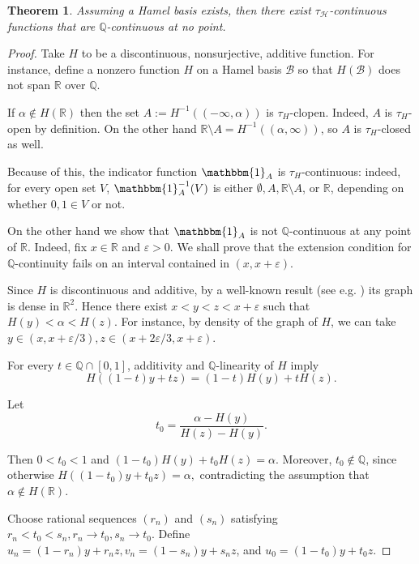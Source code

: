 \documentclass[11pt]{amsart} %
\newtheorem{theorem}{Theorem}[section]
\theoremstyle{definition}
\newcommand{\B}{\mathcal{B}}
\newcommand{\R}{\mathbb{R}}
\newcommand{\Q}{\mathbb{Q}}
\newcommand{\AD}{\mathcal{H}}
\begin{document}
\begin{theorem}
\label{thm:5.10}
Assuming a Hamel basis exists, then there exist $\tau_{\AD}$-continuous functions that are $\mathbb{Q}$-continuous at no point. 
\end{theorem}
\begin{proof} Take $H$ to be a discontinuous, nonsurjective, additive function. For instance, define a nonzero function $H$ on a Hamel basis $\B$ so that  $H(\B)$ does not span $\R$ over $\Q$. 

If $\alpha\notin H(\mathbb{R})$ then the set $A:=H^{-1}((-\infty,\alpha))$ is $\tau_{H}$-clopen. Indeed, $A$ is $\tau_H$-open by definition. On the other hand $\R\setminus A=H^{-1}((\alpha,\infty))$, so $A$ is $\tau_H$-closed as well. 

Because of this, the indicator function $\mathbbm{1}_{A}$ is $\tau_{H}$-continuous: indeed, for every open set $V$, $\mathbbm{1}_{A}^{-1}(V)$ is either $\emptyset, A,\R\setminus A$, or $\R$, depending on whether $0,1\in V$ or not. 


On the other hand we show that $\mathbbm{1}_A$ is not $\Q$-continuous at any point of $\mathbb{R}$.
Indeed, fix $x\in\mathbb{R}$ and $\varepsilon>0$. We shall prove that the
extension condition for $\Q$-continuity fails on an interval contained in
$(x,x+\varepsilon)$.

Since $H$ is discontinuous and additive, 
by a well-known result (see e.g. \cite{12}) 
its graph is dense in
$\mathbb{R}^2$. Hence there exist
$x<y<z<x+\varepsilon$ such that $H(y)<\alpha<H(z).$
For instance, by density of the graph of $H$, we can take $y\in (x,x+\varepsilon/3), z\in (x+2\varepsilon/3,x+\varepsilon)$. 


For every $t\in\mathbb{Q}\cap[0,1]$, additivity and $\mathbb{Q}$-linearity of $H$ imply
\begin{equation} 
H((1-t)y+tz)=(1-t)H(y)+tH(z).
\end{equation} 

Let
\begin{equation} 
t_0=\frac{\alpha-H(y)}{H(z)-H(y)}.
\end{equation} 

Then $0<t_0<1$ and $(1-t_0)H(y)+t_0H(z)=\alpha.$
Moreover, $t_0\notin\mathbb{Q}$, since otherwise
$H((1-t_0)y+t_0z)=\alpha,$ contradicting the assumption that $\alpha\notin H(\mathbb{R})$.

Choose rational sequences $(r_n)$ and $(s_n)$ satisfying $r_n<t_0<s_n,
r_n\to t_0,
s_n\to t_0.$  Define $
u_n=(1-r_n)y+r_nz,
v_n=(1-s_n)y+s_nz$, and
$u_0=(1-t_0)y+t_0z.$


\end{proof}
\end{document}
